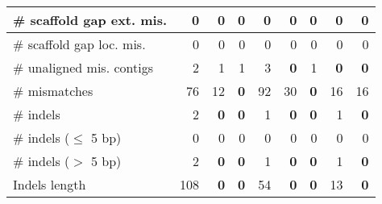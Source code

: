 \documentclass[12pt,a4paper]{article}
\begin{document}
\begin{table}[ht]
\begin{center}
\begin{tabular}{|l*{8}{|r}|}
\# scaffold gap ext. mis. & 0 & 0 & 0 & 0 & 0 & 0 & 0 & 0 \\ \hline
\# scaffold gap loc. mis. & 0 & 0 & 0 & 0 & 0 & 0 & 0 & 0 \\ \hline
\# unaligned mis. contigs & 2 & 1 & 1 & 3 & {\bf 0} & 1 & {\bf 0} & {\bf 0} \\ \hline
\# mismatches & 76 & 12 & {\bf 0} & 92 & 30 & {\bf 0} & 16 & 16 \\ \hline
\# indels & 2 & {\bf 0} & {\bf 0} & 1 & {\bf 0} & {\bf 0} & 1 & {\bf 0} \\ \hline
\hspace{5mm}\# indels ($\leq$ 5 bp) & 0 & 0 & 0 & 0 & 0 & 0 & 0 & 0 \\ \hline
\hspace{5mm}\# indels ($>$ 5 bp) & 2 & {\bf 0} & {\bf 0} & 1 & {\bf 0} & {\bf 0} & 1 & {\bf 0} \\ \hline
Indels length & 108 & {\bf 0} & {\bf 0} & 54 & {\bf 0} & {\bf 0} & 13 & {\bf 0} \\ \hline
\end{tabular}
\end{center}
\end{table}
\end{document}
